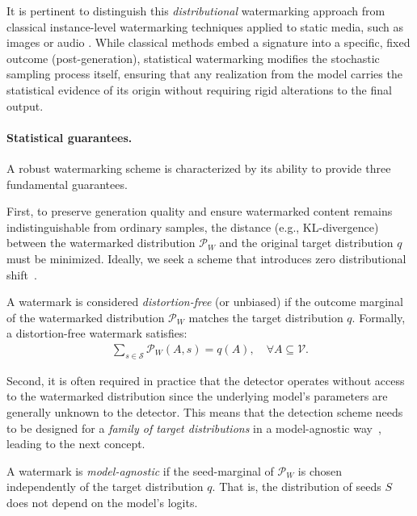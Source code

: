 It is pertinent to distinguish this \textit{distributional} watermarking approach from classical instance-level watermarking techniques applied to static media, such as images or audio \cite{cox2007digital}. While classical methods embed a signature into a specific, fixed outcome (post-generation), statistical watermarking modifies the stochastic sampling process itself, ensuring that any realization from the model carries the statistical evidence of its origin without requiring rigid alterations to the final output.

\paragraph{Statistical guarantees.}
A robust watermarking scheme is characterized by its ability to provide three fundamental guarantees.

First, to preserve generation quality and ensure watermarked content remains indistinguishable from ordinary samples, the distance (e.g., KL-divergence) between the watermarked distribution $\mathcal{P}_W$ and the original target distribution $q$ must be minimized. Ideally, we seek a scheme that introduces zero distributional shift~\citep{hu2023unbiased}.

\begin{definition}\label{def:unbias}
    A watermark is considered \textit{distortion-free} (or unbiased) if the outcome marginal of the watermarked distribution $\mathcal{P}_W$ matches the target distribution $q$. Formally, a distortion-free watermark satisfies:
    \begin{align*}
        \sum_{s \in \mathcal{S}} \mathcal{P}_W(A, s) = q(A), \quad \forall A \subseteq \mathcal{V}.
    \end{align*}
\end{definition}

Second, it is often required in practice that the detector operates without access to the watermarked distribution since the underlying model's parameters are generally unknown to the detector. This means that the detection scheme needs to be designed for a \emph{family of target distributions} in a model-agnostic way~\citep{kuditipudi2023robust}, leading to the next concept.

\begin{definition}\label{def:agnostic}
    A watermark is \textit{model-agnostic} if the seed-marginal of $\mathcal{P}_W$ is chosen independently of the target distribution $q$. That is, the distribution of seeds $S$ does not depend on the model's logits.
\end{definition}

